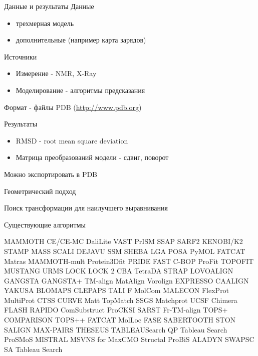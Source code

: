 \documentclass[utf8]{beamer}
\begin{document}
\begin{frame}{Данные и результаты}
Данные
\begin{itemize}
	\item трехмерная модель
	\item дополнительные (например карта зарядов)
\end{itemize}
Источники
\begin{itemize}
	\item Измерение - NMR, X-Ray
	\item Моделирование - алгоритмы предсказания
\end{itemize}	
Формат - файлы PDB (\url{http://www.pdb.org})

\vspace{11pt}

Результаты
\begin{itemize}
	\item RMSD - root mean square deviation
	\item Матрица преобразований модели - сдвиг, поворот
\end{itemize}	
Можно экспортировать в PDB
\end{frame}

\begin{frame}{Геометрический подход}
\begin{figure}[h]
\end{figure}
Поиск трансформации для наилучшего выравнивания
\end{frame}

\begin{frame}{Существующие алгоритмы}
\begin{center}
\begin{small}
MAMMOTH CE/CE-MC DaliLite VAST PrISM SSAP SARF2 KENOBI/K2 STAMP MASS SCALI DEJAVU SSM SHEBA LGA POSA PyMOL FATCAT Matras MAMMOTH-mult Protein3Dfit PRIDE FAST C-BOP ProFit TOPOFIT MUSTANG URMS LOCK LOCK 2 CBA TetraDA STRAP LOVOALIGN GANGSTA GANGSTA+ TM-align MatAlign Vorolign EXPRESSO CAALIGN YAKUSA BLOMAPS CLEPAPS TALI F MolCom MALECON FlexProt MultiProt CTSS CURVE Matt TopMatch SSGS Matchprot UCSF Chimera  FLASH RAPIDO ComSubstruct ProCKSI SARST Fr-TM-align TOPS+ COMPARISON TOPS++ FATCAT MolLoc FASE SABERTOOTH STON SALIGN MAX-PAIRS THESEUS TABLEAUSearch QP Tableau Search ProSMoS MISTRAL MSVNS for MaxCMO Structal ProBiS ALADYN SWAPSC SA Tableau Search
\end{small}
\end{center}
\end{frame}
\end{document}

